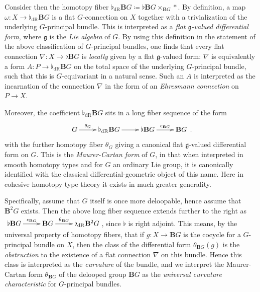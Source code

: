 \documentclass[copyright]{eptcs}
\begin{document}
Consider then the homotopy fiber
$
  \flat_{\mathrm{dR}} \mathbf{B}G \coloneqq \flat \mathbf{B}G \times_{\mathbf{B}G} {*}
$.
By definition, %
a map $\omega : X \to \flat_{\mathrm{dR}} \mathbf{B}G$ is a
flat $G$-connection on $X$ together with a trivialization of the underlying
$G$-principal bundle. This is interpreted
as a \emph{flat $\mathfrak{g}$-valued differential form}, where $\mathfrak{g}$ is the \emph{Lie algebra}
of $G$. By using this definition in the statement of the above classification of $G$-principal bundles,
one finds that every flat connection
$\nabla : X \to \flat \mathbf{B}G$ is \emph{locally} given by a flat $\mathfrak{g}$-valued form:
$\nabla$ is equivalently a form $A : P \to \flat_{\mathrm{dR}} \mathbf{B}G$ on the total space
of the underlying $G$-principal bundle, such that this is $G$-equivariant in a natural sense.
Such an $A$ is interpreted as the incarnation of the connection $\nabla$
in the form of an \emph{Ehresmann connection} on $P \to X$.

Moreover, the coefficient $\flat_{\mathrm{dR}}\mathbf{B}G$ sits in
a long fiber sequence of the form
\[
  \xymatrix{
    G
   \ar[r]^-{\theta_G}
    &
    \flat_{\mathrm{dR}}\mathbf{B}G
   \ar[r]
  &
    \flat \mathbf{B}G
   \ar[r]^-{\epsilon_{\mathbf{B}G}}
  &
  \mathbf{B}G
  }
  \,.
\]
with the further homotopy fiber $\theta_{G}$
giving a canonical flat $\mathfrak{g}$-valued differential form on $G$. This is
the \emph{Maurer-Cartan form} of $G$, in that when interpreted in smooth homotopy types
and for $G$ an ordinary Lie group, it is canonically identified with the classical
differential-geometric object of this name. Here in cohesive homotopy type theory it
exists in much greater generality.

Specifically, assume that $G$ itself is once more
deloopable, hence assume that $\mathbf{B}^2 G$ exists. Then
the above long fiber sequence extends further to the right as
$
  \xymatrix{
    \flat \mathbf{B}G
   \ar[r]^-{\epsilon_{\mathbf{B}G}}
  &
  \mathbf{B}G
   \ar[r]^-{\theta_{\mathbf{B}G}}
  &
  \flat_{\mathrm{dR}} \mathbf{B}^2 G
  }
$, since $\flat$ is right adjoint.
This means, by the universal property of homotopy fibers, that if $g : X \to \mathbf{B}G$ is the
cocycle for a $G$-principal bundle on $X$, then the class of the differential form $\theta_{\mathbf{B}G}(g)$ is the \emph{obstruction} to the existence of a flat
connection $\nabla$ on this bundle. Hence
this class is interpreted as the \emph{curvature} of the bundle, and we interpret
the Maurer-Cartan form
$\theta_{\mathbf{B}G}$ of the delooped group $\mathbf{B}G$
as the \emph{universal curvature characteristic} for $G$-principal bundles.
\end{document}
